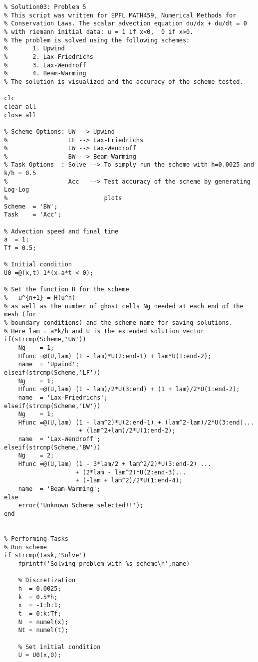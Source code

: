\documentclass{article}
\begin{document}
\begin{exerciseList}
\begin{lstlisting}
% Solution03: Problem 5
% This script was written for EPFL MATH459, Numerical Methods for
% Conservation Laws. The scalar advection equation du/dx + du/dt = 0
% with riemann initial data: u = 1 if x<0,  0 if x>0.
% The problem is solved using the following schemes:
%       1. Upwind
%       2. Lax-Friedrichs
%       3. Lax-Wendroff
%       4. Beam-Warming
% The solution is visualized and the accuracy of the scheme tested.

clc
clear all
close all

% Scheme Options: UW --> Upwind
%                 LF --> Lax-Friedrichs
%                 LW --> Lax-Wendroff
%                 BW --> Beam-Warming
% Task Options  : Solve --> To simply run the scheme with h=0.0025 and k/h = 0.5
%                 Acc   --> Test accuracy of the scheme by generating Log-Log
%                           plots
Scheme 	= 'BW';
Task 	= 'Acc';

% Advection speed and final time
a  = 1;
Tf = 0.5;

% Initial condition
U0 =@(x,t) 1*(x-a*t < 0);

% Set the function H for the scheme
%   u^{n+1} = H(u^n)
% as well as the number of ghost cells Ng needed at each end of the mesh (for
% boundary conditions) and the scheme name for saving solutions.
% Here lam = a*k/h and U is the extended solution vector
if(strcmp(Scheme,'UW'))
    Ng    = 1;
    Hfunc =@(U,lam) (1 - lam)*U(2:end-1) + lam*U(1:end-2);
    name  = 'Upwind';
elseif(strcmp(Scheme,'LF'))
    Ng    = 1;
    Hfunc =@(U,lam) (1 - lam)/2*U(3:end) + (1 + lam)/2*U(1:end-2);
    name  = 'Lax-Friedrichs';
elseif(strcmp(Scheme,'LW'))
    Ng    = 1;
    Hfunc =@(U,lam) (1 - lam^2)*U(2:end-1) + (lam^2-lam)/2*U(3:end)...
                     + (lam^2+lam)/2*U(1:end-2);
    name  = 'Lax-Wendroff';
elseif(strcmp(Scheme,'BW'))
    Ng    = 2;
    Hfunc =@(U,lam) (1 - 3*lam/2 + lam^2/2)*U(3:end-2) ...
                    + (2*lam - lam^2)*U(2:end-3)...
                    + (-lam + lam^2)/2*U(1:end-4);
    name  = 'Beam-Warming';
else
    error('Unknown Scheme selected!!');
end


% Performing Tasks
% Run scheme
if strcmp(Task,'Solve')
    fprintf('Solving problem with %s scheme\n',name)
    
    % Discretization
    h  = 0.0025;
    k  = 0.5*h;
    x  = -1:h:1;
    t  = 0:k:Tf;
    N  = numel(x);
    Nt = numel(t);
    
    % Set initial condition
    U = U0(x,0);
    

\end{lstlisting}
\end{exerciseList}
\end{document}
